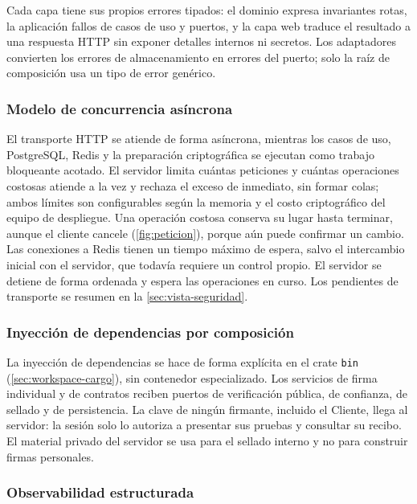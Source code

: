 Cada capa tiene sus propios errores tipados: el dominio expresa invariantes rotas, la aplicación fallos de casos de uso y puertos, y la capa web traduce el resultado a una respuesta HTTP sin exponer detalles internos ni secretos. Los adaptadores convierten los errores de almacenamiento en errores del puerto; solo la raíz de composición usa un tipo de error genérico.

\subsubsection{Modelo de concurrencia asíncrona}\label{sec:concurrencia-asincrona}

El transporte HTTP se atiende de forma asíncrona, mientras los casos de uso, PostgreSQL, Redis y la preparación criptográfica se ejecutan como trabajo bloqueante acotado. El servidor limita cuántas peticiones y cuántas operaciones costosas atiende a la vez y rechaza el exceso de inmediato, sin formar colas; ambos límites son configurables según la memoria y el costo criptográfico del equipo de despliegue. Una operación costosa conserva su lugar hasta terminar, aunque el cliente cancele (\cref{fig:peticion}), porque aún puede confirmar un cambio. Las conexiones a Redis tienen un tiempo máximo de espera, salvo el intercambio inicial con el servidor, que todavía requiere un control propio. El servidor se detiene de forma ordenada y espera las operaciones en curso. Los pendientes de transporte se resumen en la \cref{sec:vista-seguridad}.

\subsubsection{Inyección de dependencias por composición}\label{sec:inyeccion-dependencias}

La inyección de dependencias se hace de forma explícita en el crate \texttt{bin} (\cref{sec:workspace-cargo}), sin contenedor especializado. Los servicios de firma individual y de contratos reciben puertos de verificación pública, de confianza, de sellado y de persistencia. La clave de ningún firmante, incluido el Cliente, llega al servidor: la sesión solo lo autoriza a presentar sus pruebas y consultar su recibo. El material privado del servidor se usa para el sellado interno y no para construir firmas personales.

\subsubsection{Observabilidad estructurada}\label{sec:observabilidad}

